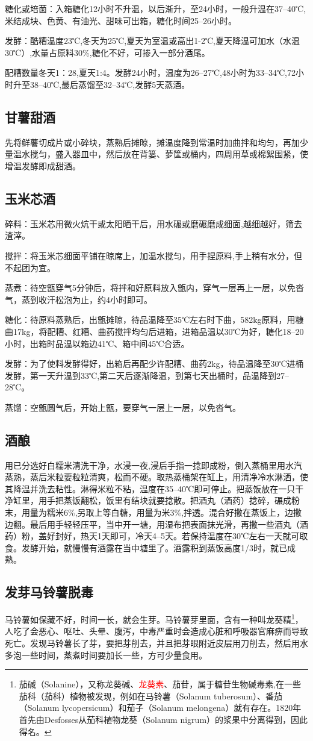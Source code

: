 \documentclass{ctexbook}
\begin{document}
糖化或培菌：入箱糖化12小时不升温，以后渐升，至24小时，一般升温在37--40℃,米结成块、色黄、有油光、甜味可出箱，糖化时间25--26小时。

发酵：酷糟温度23℃,冬天为25℃,夏天为室温或高出1-2℃,夏天降温可加水（水温30℃）,水量占原料30\%,糖化不好，可掺入一部分酒尾。

配糟数量冬天1：28,夏天1:4。发酵24小时，温度为26--27℃,48小时为33--34℃,72小时升至38--40℃,最后蒸馏至32--34℃,发酵5天蒸酒。
\subsection{甘薯甜酒}
先将鲜薯切成片或小碎块，蒸熟后摊晾，摊温度降到常温时加曲拌和均匀，再加少量温水搅匀，盛入器皿中，然后放在背篓、萝筐或桶内，四周用草或棉絮围紧，使增温发酵即成甜酒。
\subsection{玉米芯酒}
碎料：玉米芯用微火炕干或太阳晒干后，用水碾或磨碾磨成细面,越细越好，筛去渣滓。

搅拌：将玉米芯细面平铺在晾席上，加温水搅匀，用手捏原料,手上稍有水分，但不起团为宜。

蒸煮：待空甑穿气5分钟后，将拌和好原料放入甑内，穿气一层再上一层，以免沓气，蒸到收汗松泡为止，约4小时即可。

糖化：待原料蒸熟后，出甑摊晾，待品温降至35℃左右时下曲，582kg原料，用糠曲17kg，将配糟、红糟、曲药搅拌均匀后进箱，进箱品温以30℃为好，糖化18--20小时，出箱时品温以箱边41℃、箱中间45℃合适。

发酵：为了使料发酵得好，出箱后再配少许配糟、曲药2kg，待品温降至30℃进桶发酵，第一天升温到33℃,第二天后逐渐降温，到第七天出桶时，品温降到27--28℃。

蒸馏：空甑圆气后，开始上甑，要穿气一层上一层，以免沓气。
\subsection{酒酿}
用已分选好白糯米清洗干净，水浸一夜,浸后手指一捻即成粉，倒入蒸桶里用水汽蒸熟，蒸后米粒要粒粒清爽，松而不硬。取热蒸桶架在缸上，用清净冷水淋洒，使其降温并洗去粘性。淋得米粒不粘，温度在35--40℃即可停止。把蒸饭放在一只干净缸里，用手把蒸饭翻松，饭里有结块就要捻散。把酒丸（酒药）捻碎，碾成粉末，用量为糯米6\%,另取上等白糖，用量为米3\%,拌透。混合好撒在蒸饭上，边撒边翻。最后用手轻轻压平，当中开一塘，用湿布把表面抹光滑，再撒一些酒丸（酒药）粉，盖好封好，热天1天即可，冷天4--5天。若保持温度在30℃左右一天就可取食。发酵开始，就慢慢有酒露在当中塘里了。酒露积到蒸饭高度1/3时，就已成熟。
\subsection{发芽马铃薯脱毒}
马铃薯如保藏不好，时间一长，就会生芽。马铃薯芽里面，含有一种叫龙葵精\footnote{茄碱（Solanine），又称龙葵碱、\textcolor{red}{龙葵素}、茄苷，属于糖苷生物碱毒素,在一些茄科（茄科）植物被发现，例如在马铃薯（Solanum tuberosum）、番茄（Solanum lycopersicum）和茄子（Solanum melongena）就有存在。1820年首先由Desfosses从茄科植物龙葵（Solanum nigrum）的浆果中分离得到，因此得名。}，人吃了会恶心、呕吐、头晕、腹泻，中毒严重时会造成心脏和呼吸器官麻痹而导致死亡。发现马铃薯长了芽，要把芽削去，并且把芽眼附近皮层用刀削去，然后用水多泡一些时间，蒸煮时间要加长一些，方可少量食用。
\end{document}
